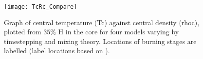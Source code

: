 \begin{figure}[H]
\begin{center}
    \texttt{[image: TcRc\_Compare]}
    \caption{Graph of central temperature (\gls{Tc}) against central density (\gls{rhoc}), plotted from $35\%$ H in the core for four models varying by timestepping and mixing theory. Locations of burning stages are labelled (label locations based on \citealp{Maeder09}).}
    \label{fig:TcRc_Compare}
\end{center}
\end{figure}